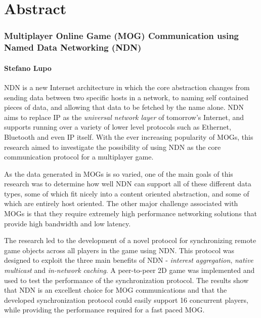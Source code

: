 \chapter*{Abstract}
\subsection*{Multiplayer Online Game (MOG) Communication using Named Data Networking (NDN)}
\subsubsection*{Stefano Lupo}
NDN is a new Internet architecture in which the core abstraction changes from sending data between two specific hosts in a network, to naming self contained pieces of data, and allowing that data to be fetched by the name alone. NDN aims to replace IP as the \textit{universal network layer} of tomorrow's Internet, and supports running over a variety of lower level protocols such as Ethernet, Bluetooth and even IP itself. With the ever increasing popularity of MOGs, this research aimed to investigate the possibility of using NDN as the core communication protocol for a multiplayer game.

As the data generated in MOGs is so varied, one of the main goals of this research was to determine how well NDN can support all of these different data types, some of which fit nicely into a content oriented abstraction, and some of which are entirely host oriented. The other major challenge associated with MOGs is that they require extremely high performance networking solutions that provide high bandwidth and low latency.

The research led to the development of a novel protocol for synchronizing remote game objects across all players in the game using NDN. This protocol was designed to exploit the three main benefits of NDN - \textit{interest aggregation}, \textit{native multicast} and \textit{in-network caching}. A peer-to-peer 2D game was implemented and used to test the performance of the synchronization protocol. The results show that NDN is an excellent choice for MOG communications and that the developed synchronization protocol could easily support 16 concurrent players, while providing the performance required for a fast paced MOG. 